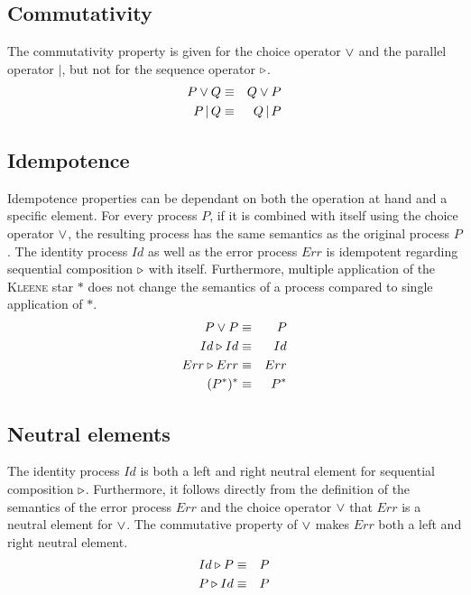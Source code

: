 \subsection{Commutativity}
The commutativity property is given for the choice operator $\vee$ and the parallel operator $|$, but not for the sequence operator $\triangleright$.
\begin{eqnarray*}
  P \vee Q & \equiv & Q \vee P \\
  P \,|\, Q & \equiv & Q \,|\, P
\end{eqnarray*}

\subsection{Idempotence}
Idempotence properties can be dependant on both the operation at hand and a specific element. For every process $P$, if it is combined with itself using the choice operator $\vee$, the resulting process has the same semantics as the original process $P$. The identity process $Id$ as well as the error process $Err$ is idempotent regarding sequential composition $\triangleright$ with itself. Furthermore, multiple application of the \textsc{Kleene} star $*$ does not change the semantics of a process compared to single application of $*$.
\begin{eqnarray*}
  P \vee P & \equiv & P \\
  Id \triangleright Id & \equiv & Id \\
  Err \triangleright Err & \equiv & Err \\
  (P^*)^* & \equiv & P^*
\end{eqnarray*}

\subsection{Neutral elements}
The identity process $Id$ is both a left and right neutral element for sequential composition $\triangleright$. Furthermore, it follows directly from the definition of the semantics of the error process $Err$ and the choice operator $\vee$ that $Err$ is a neutral element for $\vee$. The commutative property of $\vee$ makes $Err$ both a left and right neutral element.
\begin{eqnarray*}
  Id \triangleright P & \equiv & P \\
  P \triangleright Id & \equiv & P
\end{eqnarray*}